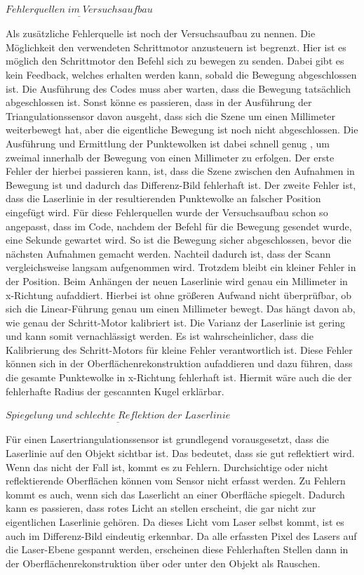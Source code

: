 		$\underline{Fehlerquellen \; im \; Versuchsaufbau}$
		
		Als zusätzliche Fehlerquelle ist noch der Versuchsaufbau zu nennen. Die Möglichkeit den verwendeten Schrittmotor anzusteuern ist begrenzt. Hier ist es möglich den Schrittmotor den Befehl sich zu bewegen zu senden. Dabei gibt es kein Feedback, welches erhalten werden kann, sobald die Bewegung abgeschlossen ist. Die Ausführung des Codes muss aber warten, dass die Bewegung tatsächlich abgeschlossen ist. Sonst könne es passieren, dass in der Ausführung der Triangulationssensor davon ausgeht, dass sich die Szene um einen Millimeter weiterbewegt hat, aber die eigentliche Bewegung ist noch nicht abgeschlossen. Die Ausführung und Ermittlung der Punktewolken ist dabei schnell genug , um zweimal innerhalb der Bewegung von einen Millimeter zu erfolgen. Der erste Fehler der hierbei passieren kann, ist, dass die Szene zwischen den Aufnahmen in Bewegung ist und dadurch das Differenz-Bild fehlerhaft ist. Der zweite Fehler ist, dass die Laserlinie in der resultierenden Punktewolke an falscher Position eingefügt wird. Für diese Fehlerquellen wurde der Versuchsaufbau schon so angepasst, dass im Code, nachdem der Befehl für die Bewegung gesendet wurde, eine Sekunde gewartet wird. So ist die Bewegung sicher abgeschlossen, bevor die nächsten Aufnahmen gemacht werden. Nachteil dadurch ist, dass der Scann vergleichsweise langsam aufgenommen wird. Trotzdem bleibt ein kleiner Fehler in der Position. Beim Anhängen der neuen Laserlinie wird genau ein Millimeter in x-Richtung aufaddiert. Hierbei ist ohne größeren Aufwand nicht überprüfbar, ob sich die Linear-Führung genau um einen Millimeter bewegt. Das hängt davon ab, wie genau der Schritt-Motor kalibriert ist. Die Varianz der Laserlinie ist gering und kann somit vernachlässigt werden. Es ist wahrscheinlicher, dass die Kalibrierung des Schritt-Motors für kleine Fehler verantwortlich ist. Diese Fehler können sich in der Oberflächenrekonstruktion aufaddieren und dazu führen, dass die gesamte Punktewolke in x-Richtung fehlerhaft ist. Hiermit wäre auch die der fehlerhafte Radius der gescannten Kugel erklärbar.
		
		$\underline{Spiegelung \; und \; schlechte \; Reflektion \; der \; Laserlinie}$
		
		Für einen Lasertriangulationssensor ist grundlegend vorausgesetzt, dass die Laserlinie auf den Objekt sichtbar ist. Das bedeutet, dass sie gut reflektiert wird. Wenn das nicht der Fall ist, kommt es zu Fehlern. Durchsichtige oder nicht reflektierende Oberflächen können vom Sensor nicht erfasst werden. Zu Fehlern kommt es auch, wenn sich das Laserlicht an einer Oberfläche spiegelt. Dadurch kann es passieren, dass rotes Licht an stellen erscheint, die gar nicht zur eigentlichen Laserlinie gehören. Da dieses Licht vom Laser selbst kommt, ist es auch im Differenz-Bild eindeutig erkennbar. Da alle erfassten Pixel des Lasers auf die Laser-Ebene gespannt werden, erscheinen diese Fehlerhaften Stellen dann in der Oberflächenrekonstruktion über oder unter den Objekt als Rauschen. 
		\citep[Vgl.][]{song_multi-view_2019}